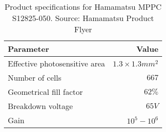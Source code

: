 \begin{table}
  \centering
  \begin{tabular}{ l l r }
    \multicolumn{2}{l}{Parameter}                             & Value                 \\
    \hline
    \multicolumn{2}{l}{Effective photosensitive area}         & $1.3 \times 1.3 mm^2$ \\
    \multicolumn{2}{l}{Number of cells}                       & $667$                 \\
    \multicolumn{2}{l}{Geometrical fill factor}               & $62 \%$               \\
    \multicolumn{2}{l}{Breakdown voltage}                     & $65 V$                \\
    \multicolumn{2}{l}{Gain}                                  & $10^5 - 10^6$         \\
    \hline
  \end{tabular}
  \caption{
    Product specifications for Hamamatsu MPPC S12825-050.
    Source: Hamamatsu Product Flyer
  }
  \label{tab:sipm_specs}
\end{table}

